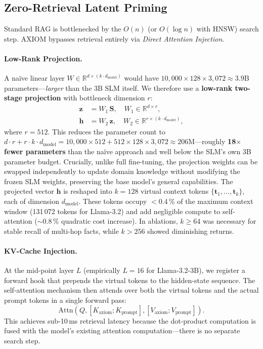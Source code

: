 \documentclass[11pt,a4paper]{article}
\begin{document}
\subsection{Zero-Retrieval Latent Priming}
\label{sec:priming}

Standard RAG is bottlenecked by the $O(n)$ (or $O(\log n)$ with HNSW)
search step.  AXIOM bypasses retrieval entirely via \emph{Direct Attention
Injection}.

\paragraph{Low-Rank Projection.}
A na\"ive linear layer $W \in \mathbb{R}^{d \times (k \cdot
d_{\text{model}})}$ would have $10{,}000 \times 128 \times 3{,}072
\approx 3.9\text{B}$ parameters---\emph{larger} than the 3B SLM itself.
We therefore use a \textbf{low-rank two-stage projection} with bottleneck
dimension $r$:
\begin{align}
    \mathbf{z} &= W_1 \, \mathbf{S}, \quad
        W_1 \in \mathbb{R}^{d \times r},
        \label{eq:proj_stage1} \\
    \mathbf{h} &= W_2 \, \mathbf{z}, \quad
        W_2 \in \mathbb{R}^{r \times (k \cdot d_{\text{model}})},
        \label{eq:proj_stage2}
\end{align}
where $r = 512$.  This reduces the parameter count to
$d \cdot r + r \cdot k \cdot d_{\text{model}} = 10{,}000 \times 512 +
512 \times 128 \times 3{,}072 \approx 206\text{M}$---roughly
\textbf{18$\times$ fewer parameters} than the na\"ive approach and
well below the SLM's own 3B parameter budget.
Crucially, unlike full fine-tuning, the projection weights can be
swapped independently to update domain knowledge without modifying the
frozen SLM weights, preserving the base model's general capabilities.
The projected vector $\mathbf{h}$ is reshaped into $k = 128$ virtual
context tokens $\{\mathbf{t}_1, \ldots, \mathbf{t}_k\}$, each of
dimension $d_{\text{model}}$.  These tokens occupy $<$0.4\,\% of the
maximum context window (131\,072 tokens for Llama-3.2) and add negligible
compute to self-attention ($\sim$0.8\,\% quadratic cost increase).
In ablations, $k \geq 64$ was necessary for stable recall of multi-hop
facts, while $k > 256$ showed diminishing returns.

\paragraph{KV-Cache Injection.}
At the mid-point layer $L$ (empirically $L = 16$ for Llama-3.2-3B), we
register a forward hook that prepends the virtual tokens to the hidden-state
sequence.  The self-attention mechanism then attends over both the virtual
tokens and the actual prompt tokens in a single forward pass:
\begin{equation}
    \text{Attn}(Q, [K_{\text{axiom}}; K_{\text{prompt}}],
                   [V_{\text{axiom}}; V_{\text{prompt}}]).
    \label{eq:injection}
\end{equation}
This achieves sub-10\,ms retrieval latency because the dot-product
computation is fused with the model's existing attention
computation---there is no separate search step.
\end{document}
